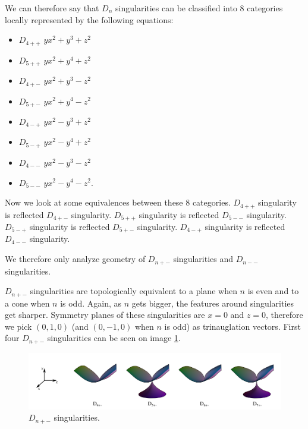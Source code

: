 We can therefore say that $D_n$ singularities can be classified into 8 categories
locally represented by the following equations:
\begin{itemize}
    \item $D_{4++}$ \hspace{5mm} $yx^2 + y^3 + z^2$
    \item $D_{5++}$ \hspace{5mm} $yx^2 + y^4 + z^2$
    \item $D_{4+-}$ \hspace{5mm} $yx^2 + y^3 - z^2$
    \item $D_{5+-}$ \hspace{5mm} $yx^2 + y^4 - z^2$
    \item $D_{4-+}$ \hspace{5mm} $yx^2 - y^3 + z^2$
    \item $D_{5-+}$ \hspace{5mm} $yx^2 - y^4 + z^2$
    \item $D_{4--}$ \hspace{5mm} $yx^2 - y^3 - z^2$
    \item $D_{5--}$ \hspace{5mm} $yx^2 - y^4 - z^2$.
\end{itemize}

Now we look at some equivalences between these 8 categories.
$D_{4++}$ singularity is reflected $D_{4+-}$ singularity.
$D_{5++}$ singularity is reflected $D_{5--}$ singularity.
$D_{5-+}$ singularity is reflected $D_{5+-}$ singularity.
$D_{4-+}$ singularity is reflected $D_{4--}$ singularity.

We therefore only analyze geometry of $D_{n+-}$ singularities and
$D_{n--}$ singularities.

$D_{n+-}$ singularities are topologically equivalent to a plane when $n$ is
even and to a cone when $n$ is odd. Again, as $n$ gets bigger, the features
around singularities get sharper. Symmetry planes of these singularities
are $x=0$ and $z=0$, therefore we pick $(0, 1, 0)$ (and $(0, -1, 0)$ when $n$ is odd)
as trinauglation vectors. First four $D_{n+-}$ singularities can be seen on
image \ref{img:7}.

\begin{figure}
    \centerline{\includegraphics[width=1\textwidth]{images/img7}}
    \caption[$D_{n+-}$ singularities]
    {$D_{n+-}$ singularities. \cite{singsurf}}
    \label{img:7}
\end{figure}


